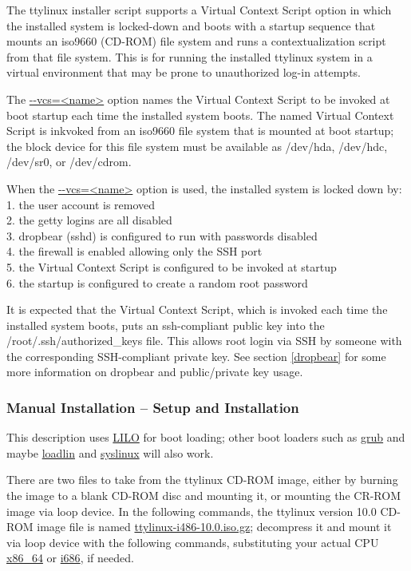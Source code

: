\documentclass[10pt]{article}
\begin{document}
The ttylinux installer script supports a Virtual Context Script option in which
the installed system is locked-down and boots with a startup sequence that
mounts an iso9660 (CD-ROM) file system and runs a contextualization script from
that file system. This is for running the installed ttylinux system in a
virtual environment that may be prone to unauthorized log-in attempts.

The \url{--vcs=<name>} option names the Virtual Context Script to be invoked at
boot startup each time the installed system boots. The named Virtual Context
Script is inkvoked from an iso9660 file system that is mounted at boot startup;
the block device for this file system must be available as /dev/hda, /dev/hdc,
/dev/sr0, or /dev/cdrom.

When the \url{--vcs=<name>} option is used, the installed system is locked down
by:\\
1. the user account is removed\\
2. the getty logins are all disabled\\
3. dropbear (sshd) is configured to run with passwords disabled\\
4. the firewall is enabled allowing only the SSH port\\
5. the Virtual Context Script is configured to be invoked at startup\\
6. the startup is configured to create a random root password

It is expected that the Virtual Context Script, which is invoked each time the
installed system boots, puts an ssh-compliant public key into the
/root/.ssh/authorized\_keys file. This allows root login via SSH by someone
with the corresponding SSH-compliant private key. See section \ref{dropbear}
for some more information on dropbear and public/private key usage.
 
\subsubsection{Manual Installation -- Setup and Installation}

This description uses \url{LILO} for boot loading; other boot loaders such as
\url{grub} and maybe \url{loadlin} and \url{syslinux} will also work.

There are two files to take from the ttylinux CD-ROM image, either by burning
the image to a blank CD-ROM disc and mounting it, or mounting the CR-ROM image
via loop device. In the following commands, the ttylinux version 10.0 CD-ROM
image file is named \url{ttylinux-i486-10.0.iso.gz}; decompress it and mount it
via loop device with the following commands, substituting your actual CPU
\url{x86_64} or \url{i686}, if needed.
\end{document}

